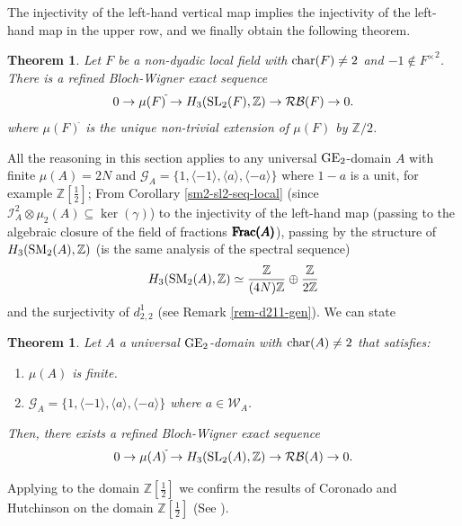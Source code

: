 \documentclass[11pt]{amsart}
\theoremstyle{definition}
\theoremstyle{plain}
\newtheorem{thm}[ntn]{Theorem}
\numberwithin{equation}{section}
\newcommand{\z}{\mathbb{Z}}
\newcommand{\GG}{\mathcal{G}}
\newcommand{\WW}{\mathcal{W}}
\newcommand{\II}{\mathcal{I}}
\newcommand{\RB}{\mathcal{RB}}
\newcommand{\half}{{\left[\frac{1}{2}\right]}}
\newcommand{\lan}{\langle}
\newcommand{\ran}{\rangle}
\newcommand{\GE}{{\rm GE}}
\newcommand{\ffrac}{{\rm Frac}}
\newcommand{\SL}{\mathit{{\rm SL}}}
\newcommand{\SM}{\mathit{{\rm SM}}}
\renewcommand{\char}{{\rm char}}
\begin{document}
The injectivity of the left-hand vertical map implies the injectivity of the left-hand map in the upper row, and we finally obtain the following theorem.
\begin{thm}\label{thm-sm2-sl2-local}
    Let $F$ be a non-dyadic local field with $\char(F)\neq 2$ and $-1\notin {F^\times}^2$. There is a refined Bloch-Wigner exact sequence
    \[
        0\to\mu(F)^{\tilde{}}\to H_3(\SL_2(F),\z)\to\RB(F)\to 0.
    \]
    where $\mu(F)^{\tilde{}}$ is the unique non-trivial extension of $\mu(F)$ by $\z/2$.
\end{thm}
All the reasoning in this section applies to any universal $\GE_2$-domain $A$ with finite $\mu(A)=2N$ and $\GG_A=\{1,\lan-1\ran,\lan a\ran,\lan-a\ran\}$ where $1-a$ is a unit, for example $\z\half$; From Corollary \ref{sm2-sl2-seq-local} (since $\II_A^2\otimes\mu_2(A)\subseteq\ker(\gamma)$) to the injectivity of the left-hand map (passing to the algebraic closure of the field of fractions $\pmb{\ffrac(A)}$), passing by the structure of $H_3(\SM_2(A),\z)$ (is the same analysis of the spectral sequence)
\[
    H_3(\SM_2(A),\z)\simeq\frac{\z}{(4N)\z}\oplus\frac{\z}{2\z}
\]
and the surjectivity of $d^1_{2,2}$ (see Remark \ref{rem-d211-gen}). We can state
\begin{thm}\label{thm-sm2-sl2-g}
    Let $A$ a universal $\GE_2$-domain with $\char(A)\neq 2$ that satisfies:
    \begin{enumerate}
        \item $\mu(A)$ is finite.
        \item $\GG_A=\{1,\lan-1\ran,\lan a\ran,\lan -a\ran\}$ where $a\in\WW_A$.
    \end{enumerate}
    Then, there exists a refined Bloch-Wigner exact sequence
    \[
        0\to\mu(A)^{\tilde{}}\to H_3(\SL_2(A),\z)\to\RB(A)\to 0.
    \]
\end{thm}
Applying to the domain $\z\half$ we confirm the results of Coronado and Hutchinson on the domain $\z\half$ (See \cite[\S 8]{C-H2022}).
\end{document}
